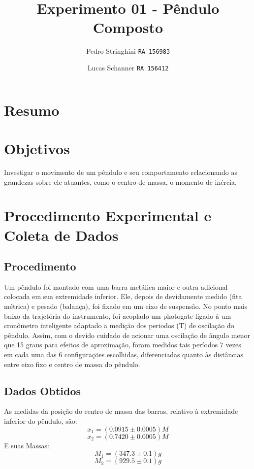 \documentclass[12pt,a4paper]{article}
\begin{document}
\title{Experimento 01 - Pêndulo Composto}
\author{Pedro Stringhini 
		\texttt{RA 156983}
		\and
		Lucas Schanner 
		\texttt{RA 156412}}
\maketitle
\newpage
\section{Resumo}

\section{Objetivos}
Investigar o movimento de um pêndulo e seu comportamento relacionando as grandezas sobre ele atuantes, como o centro de massa, o momento de inércia.

\section{Procedimento Experimental e Coleta de Dados}
\subsection{Procedimento}

Um pêndulo foi montado com uma barra metálica maior e outra adicional colocada em sua extremidade inferior. Ele, depois de devidamente medido (fita métrica) e pesado (balança), foi fixado em um eixo de suspensão. No ponto mais baixo da trajetória do instrumento, foi acoplado um photogate ligado à um cronômetro inteligente adaptado a medição dos periodos (T) de oscilação do pêndulo. Assim, com o devido cuidado de acionar uma oscilação de ângulo menor que 15 graus para efeitos de aproximação, foram medidos tais períodos 7 vezes em cada uma das 6 configurações escolhidas, diferenciadas quanto às distâncias entre eixo fixo e centro de massa do pêndulo.\\

\subsection{Dados Obtidos}

As medidas da posição do centro de massa das barras, relativo à extremidade inferior do pêndulo, são: \\
$$ x_1 = (0.0915 \pm 0.0005) M$$
$$ x_2 = (0.7420 \pm 0.0005) M$$
E suas Massas:\\
$$ M_1 = (347.3 \pm 0.1) g $$
$$ M_2 = (929.5 \pm 0.1) g $$
\end{document}
